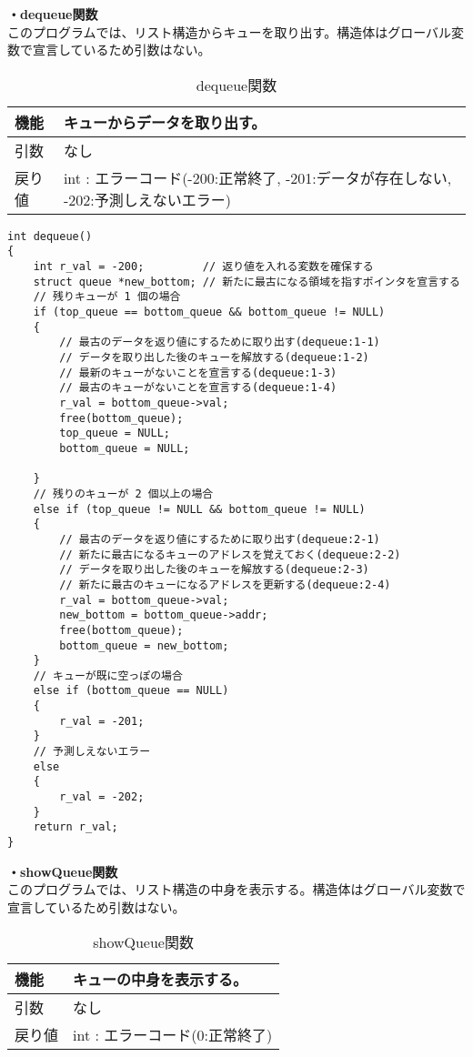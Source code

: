 \documentclass[dvipdfmx]{jsarticle}
\begin{document}
\textbf{・dequeue関数}\\
このプログラムでは、リスト構造からキューを取り出す。構造体はグローバル変数で宣言しているため引数はない。
\begin{table}[ht]
  \centering
  \caption{dequeue関数}
  \begin{tabular}{|p{5cm}|p{10cm}|}
    \hline
    機能  & キューからデータを取り出す。                                      \\
    \hline
    引数  & なし \\
    \hline
    戻り値 & int : エラーコード(-200:正常終了, -201:データが存在しない, -202:予測しえないエラー) \\
    \hline
  \end{tabular}
  \label{tab:dequeue_func_3}
\end{table}
\begin{lstlisting}[caption={dequeue関数}, label={lst:dequeue_func_3}]
int dequeue()
{
    int r_val = -200;         // 返り値を入れる変数を確保する
    struct queue *new_bottom; // 新たに最古になる領域を指すポインタを宣言する
    // 残りキューが 1 個の場合
    if (top_queue == bottom_queue && bottom_queue != NULL)
    {
        // 最古のデータを返り値にするために取り出す(dequeue:1-1)
        // データを取り出した後のキューを解放する(dequeue:1-2)
        // 最新のキューがないことを宣言する(dequeue:1-3)
        // 最古のキューがないことを宣言する(dequeue:1-4)
        r_val = bottom_queue->val;
        free(bottom_queue);
        top_queue = NULL;
        bottom_queue = NULL;
        
    }
    // 残りのキューが 2 個以上の場合
    else if (top_queue != NULL && bottom_queue != NULL)
    {
        // 最古のデータを返り値にするために取り出す(dequeue:2-1)
        // 新たに最古になるキューのアドレスを覚えておく(dequeue:2-2)
        // データを取り出した後のキューを解放する(dequeue:2-3)
        // 新たに最古のキューになるアドレスを更新する(dequeue:2-4)
        r_val = bottom_queue->val;
        new_bottom = bottom_queue->addr;
        free(bottom_queue);
        bottom_queue = new_bottom;
    }
    // キューが既に空っぽの場合
    else if (bottom_queue == NULL)
    {
        r_val = -201;
    }
    // 予測しえないエラー
    else
    {
        r_val = -202;
    }
    return r_val;
}
\end{lstlisting}
\textbf{・showQueue関数}\\
このプログラムでは、リスト構造の中身を表示する。構造体はグローバル変数で宣言しているため引数はない。
\begin{table}[ht]
  \centering
  \caption{showQueue関数}
  \begin{tabular}{|p{5cm}|p{10cm}|}
    \hline
    機能  & キューの中身を表示する。                                      \\
    \hline
    引数  & なし \\
    \hline
    戻り値 & int : エラーコード(0:正常終了) \\
    \hline
  \end{tabular}
  \label{tab:showQueue_func_3}
\end{table}
\end{document}

